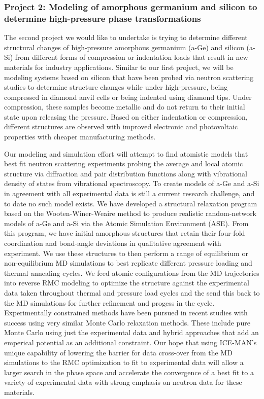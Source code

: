 \subsubsection*{Project 2: Modeling of amorphous germanium and silicon to determine high-pressure phase transformations}\label{haberl}

The second project we would like to undertake is trying to determine different structural changes of high-pressure amorphous germanium (a-Ge) and silicon (a-Si) from different forms of compression or indentation loads that result in new materials for industry applications. Similar to our first project, we will be modeling systems based on silicon that have been probed via neutron scattering studies to determine structure changes while under high-pressure, being compressed in diamond anvil cells or being indented using diamond tips. Under compression, these samples become metallic and do not return to their initial state upon releasing the pressure. Based on either indentation or compression, different structures are observed with improved electronic and photovoltaic properties with cheaper manufacturing methods. 

Our modeling and simulation effort will attempt to find atomistic models that best fit neutron scattering experiments probing the average and local atomic structure via diffraction and pair distribution functions along with vibrational density of states from vibrational spectroscopy. To create models of a-Ge and a-Si in agreement with all experimental data is still a current research challenge, and to date no such model exists. We have developed a structural relaxation program based on the Wooten-Winer-Weaire method to produce realistic random-network models of a-Ge and a-Si via the Atomic Simulation Environment (ASE). From this program, we have initial amorphous structures that retain their four-fold coordination and bond-angle deviations in qualitative agreement with experiment. We use these structures to then perform a range of equilibrium or non-equilibrium MD simulations to best replicate different pressure loading and thermal annealing cycles. We feed atomic configurations from the MD trajectories into reverse RMC modeling to optimize the structure against the experimental data taken throughout thermal and pressure load cycles and the send this back to the MD simulations for further refinement and progess in the cycle. Experimentally constrained methods have been pursued in recent studies with success using very similar Monte Carlo relaxation methods. These include pure Monte Carlo using just the experimental data and hybrid approaches that add an emperical potential as an additional constraint. Our hope that using ICE-MAN's unique capability of lowering the barrier for data cross-over from the MD simulations to the RMC optimization to fit to experimental data will allow a larger search in the phase space and accelerate the convergence of a best fit to a variety of experimental data with strong emphasis on neutron data for these materials.